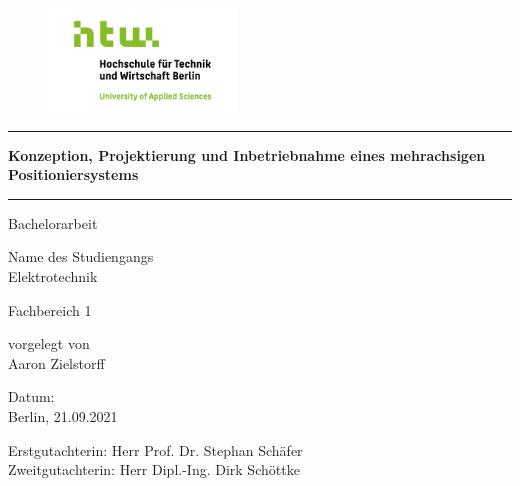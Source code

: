 \documentclass[12pt, a4paper, twoside]{article} %
\begin{document}
\begin{titlepage}

	\vspace*{-2.0cm}

	\begin{figure}[h]\centering
		\includegraphics[width=5cm]{Images/HTW_Logo.png}
	\end{figure}

	\begin{center}
	\vspace*{-1.59cm}

	\par\noindent\rule{\textwidth}{0.4pt}
	\huge
	\textcolor{htw}{\textbf{Konzeption, Projektierung und Inbetriebnahme eines mehrachsigen Positioniersystems}}
	\par\noindent\rule{\textwidth}{0.4pt}
	\vspace*{2.0cm}
	\Large
	Bachelorarbeit
	
	\normalsize
	Name des Studiengangs\\
	\vspace*{0.4cm}
	\Large
	Elektrotechnik
	
	\vspace*{0.6cm}
	\Large
	\textcolor{htw}{Fachbereich 1}
	
	\vspace*{0.6cm}
	\normalsize
	vorgelegt von\\
	\vspace*{0.4cm}
	\Large
	Aaron Zielstorff
	
	\vspace*{3.0cm}
	\small
	Datum:\\
	\normalsize
	Berlin, 21.09.2021
	
	\vspace*{1.6cm}
	\normalsize
	Erstgutachter\textunderscore in: Herr Prof. Dr. Stephan Schäfer\\
	Zweitgutachter\textunderscore in: Herr Dipl.-Ing. Dirk Schöttke
	
	\end{center}
\end{titlepage}


\pagestyle{empty}
\setcounter{tocdepth}{3} %
\tableofcontents
\clearpage
\end{document}
